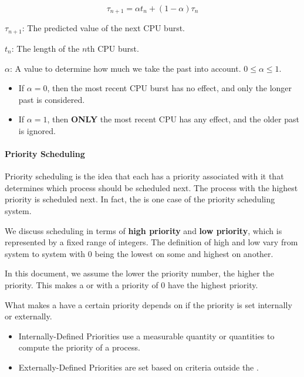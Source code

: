 \begin{equation}\label{eq:Exponential_Average}
  \tau_{n+1} = \alpha t_{n} + (1-\alpha) \tau_{n}
\end{equation}
\begin{description}[noitemsep]
\item $\tau_{n+1}$: The predicted value of the next CPU burst.
\item $t_{n}$: The length of the $n$th CPU burst.
\item $\alpha$: A value to determine how much we take the past into account. $0 \leq \alpha \leq 1$.
  \begin{itemize}[noitemsep]
  \item If $\alpha = 0$, then the most recent CPU burst has no effect, and only the longer past is considered.
  \item If $\alpha = 1$, then \textbf{ONLY} the most recent CPU has any effect, and the older past is ignored.
  \end{itemize}
\end{description}

\paragraph{Priority Scheduling}\label{par:Priority_Scheduling}
Priority scheduling is the idea that each  has a priority associated with it that determines which process should be scheduled next.
The process with the highest priority is scheduled next.
In fact, the  is one case of the priority scheduling system.

We discuss scheduling in terms of \textbf{high priority} and \textbf{low priority}, which is represented by a fixed range of integers.
The definition of high and low vary from system to system with 0 being the lowest on some and highest on another.

\begin{blackbox}
  In this document, we assume the lower the priority number, the higher the priority.
  This makes a  or  with a priority of 0 have the highest priority.
\end{blackbox}

What makes a  have a certain priority depends on if the priority is set internally or externally.
\begin{itemize}[noitemsep]
\item Internally-Defined Priorities use a measurable quantity or quantities to compute the priority of a process.
\item Externally-Defined Priorities are set based on criteria outside the .
\end{itemize}

